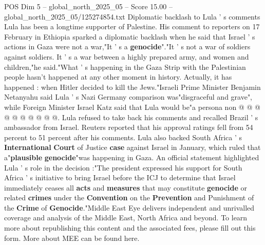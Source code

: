 \begin{textsample}{POS Dim 5 – global\_north\_2025\_05 – Score 15.00 – global\_north\_2025\_05/125274854.txt}
Diplomatic backlash to Lula ' s comments Lula has been a longtime supporter of Palestine.
His comment to reporters on 17 February in Ethiopia sparked a diplomatic backlash when he said that Israel ' s actions in Gaza were not a war,"It ' s a \textbf{genocide}"."It ' s not a war of soldiers against soldiers.
It ' s a war between a highly prepared army, and women and children,"he said."What ' s happening in the Gaza Strip with the Palestinian people hasn't happened at any other moment in history.
Actually, it has happened : when Hitler decided to kill the Jews."Israeli Prime Minister Benjamin Netanyahu said Lula ' s Nazi Germany comparison was"disgraceful and grave", while Foreign Minister Israel Katz said that Lula would be"a persona non @ @ @ @ @ @ @ @ @ @.
Lula refused to take back his comments and recalled Brazil ' s ambassador from Israel.
Reuters reported that his approval ratings fell from 54 percent to 51 percent after his comments.
Lula also backed South Africa ' s \textbf{International} \textbf{Court} of Justice \textbf{case} against Israel in January, which ruled that a"\textbf{plausible} \textbf{genocide}"was happening in Gaza.
An official statement highlighted Lula ' s role in the decision :"The president expressed his support for South Africa ' s initiative to bring Israel before the ICJ to determine that Israel immediately ceases all \textbf{acts} and \textbf{measures} that may constitute \textbf{genocide} or related \textbf{crimes} under the \textbf{Convention} on the \textbf{Prevention} and Punishment of the \textbf{Crime} of \textbf{Genocide}."Middle East Eye delivers independent and unrivalled coverage and analysis of the Middle East, North Africa and beyond.
To learn more about republishing this content and the associated fees, please fill out this form.
More about MEE can be found here.

\end{textsample}
